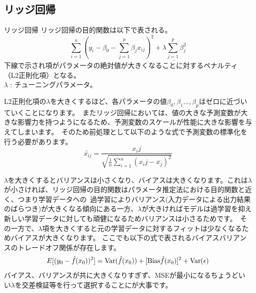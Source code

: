 \documentclass[uplatex]{jsarticle}
\begin{document}
\subsection{リッジ回帰}
\begin{itembox}[l]{リッジ回帰}
  リッジ回帰の目的関数は以下で表される。
  $$\sum_{i=1}^n \left(y_i - \beta_0 - \sum_{j=1}^p \beta_jx_{ij}\right)^2 + \underline{\lambda \sum_{j=1}^p \beta_j^2}$$
下線で示され項がパラメータの絶対値が大きくなることに対するペナルティ（L2正則化項）となる。\\
$\lambda$ : チューニングパラメータ。
\end{itembox}
L2正則化項の$\lambda$を大きくするほど、各パラメータの値$\beta_0, \beta_1..., \beta_p$はゼロに近づいていくことになります。\
またリッジ回帰においては、値の大きな予測変数が大きな影響力を持つようになるため、予測変数のスケールが性能に大きな影響を与えてしまいます。\
そのため前処理として以下のような式で予測変数の標準化を行う必要があります。
\begin{equation}
  \widetilde{x_{ij}} = \frac{x_ij}{\sqrt{\frac{1}{n} \sum_{i=1}^n (x_ij - \overline{x_j})^2}}
\end{equation}

$\lambda$を大きくするとバリアンスは小さくなり、バイアスは大きくなります。これは$\lambda$が小さければ、リッジ回帰の目的関数はパラメータ推定法における目的関数と近く、つまり学習データへの\
過学習によりバリアンス(入力データによる出力結果のばらつき)が大きくなる傾向にある一方、$\lambda$が大きければモデルは過学習を抑え新しい学習データに対しても頑健になるためバリアンスは小さるためです。\
その一方で、$\lambda$項を大きくすると元の学習データに対するフィットは少なくなるためバイアスが大きくなります。
ここでも以下の式で表されるバイアスバリアンスのトレードオフ関係が存在します。
\begin{equation}
  E[(y_0 - \hat{f}(x_0))^2] = {\rm Var}(\hat{f}(x_0)) + [{\rm Bias}\hat{f}(x_0)]^2 + {\rm Var}(\epsilon)
\end{equation}
バイアス、バリアンスが共に大きくなりすぎず、MSEが最小になるちょうどいい$\lambda$を交差検証等を行って選択することにが大事です。
\end{document}

